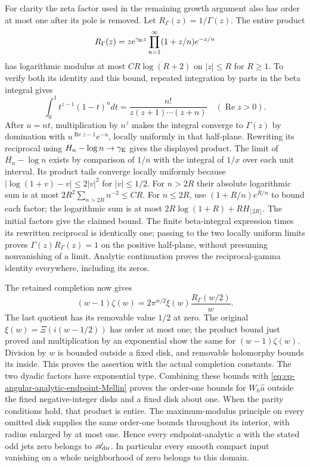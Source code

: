 For clarity the zeta factor used in the remaining growth argument
also has order at most one after its pole is removed.
Let $R_\Gamma(z)=1/\Gamma(z)$. The entire product
\[
 R_\Gamma(z)=
 z e^{\gamma_{\rm E}z}
       \prod_{n=1}^\infty(1+z/n)e^{-z/n}
\]
has logarithmic modulus at most $C R\log(R+2)$ on $|z|\leq R$
for $R\geq1$. To verify both its identity and this bound, repeated
integration by parts in the beta integral gives
\[
 \int_0^1t^{z-1}(1-t)^n dt
     =\frac{n!}{z(z+1)\cdots(z+n)}
              \quad(\operatorname{Re}z>0).
\]
After $u=nt$, multiplication by $n^z$ makes the integral converge
to $\Gamma(z)$ by domination with $u^{\operatorname{Re}z-1}e^{-u}$,
locally uniformly in that half-plane. Rewriting its reciprocal
using $H_n-\log n\to\gamma_{\rm E}$ gives the displayed product.
The limit of $H_n-\log n$ exists by comparison of $1/n$ with
the integral of $1/x$ over each unit interval. Its product tails
converge locally uniformly because
$|\log(1+v)-v|\leq2|v|^2$ for $|v|\leq1/2$.
For $n>2R$ their absolute logarithmic sum is at most
$2R^2\sum_{n>2R}n^{-2}\leq C R$.
For $n\leq2R$, use
$(1+R/n)e^{R/n}$ to bound each factor; the logarithmic sum is
at most $2R\log(1+R)+R H_{\lfloor2R\rfloor}$.
The initial factors give the claimed bound. The finite beta-integral
expression times its rewritten reciprocal is identically one;
passing to the two locally uniform limits proves
$\Gamma(z)R_\Gamma(z)=1$ on the positive half-plane, without
presuming nonvanishing of a limit. Analytic continuation proves
the reciprocal-gamma identity everywhere, including its zeros.

The retained completion now gives
\[
 (w-1)\zeta(w)
     =2\pi^{w/2}\xi(w)\frac{R_\Gamma(w/2)}w .
\]
The last quotient has its removable value $1/2$ at zero.
The original $\xi(w)=\Xi(i(w-1/2))$ has order at most one;
the product bound just proved and multiplication by an exponential
show the same for $(w-1)\zeta(w)$. Division by $w$ is bounded
outside a fixed disk, and removable holomorphy bounds its inside.
This proves the assertion with the actual completion constants.
The two dyadic factors have exponential type. Combining these
bounds with \eqref{eq:cq-angular-analytic-endpoint-Mellin} proves
the order-one bounds for $W_h\widehat a$ outside the fixed
negative-integer disks and a fixed disk about one.
When the parity conditions hold, that product is entire. The
maximum-modulus principle on every omitted disk supplies the same
order-one bounds throughout its interior, with radius enlarged
by at most one. Hence every endpoint-analytic $a$ with the stated
odd jets zero belongs to $\mathscr A_{\rm dir}$.
In particular every smooth compact input vanishing on a whole
neighborhood of zero belongs to this domain.

